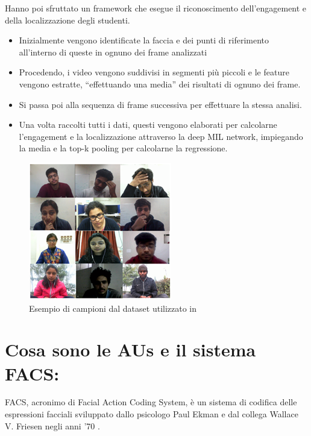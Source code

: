 Hanno poi sfruttato un framework che esegue il riconoscimento dell’engagement e della localizzazione degli studenti.
\begin{itemize}
    \item Inizialmente vengono identificate la faccia e dei punti di riferimento all’interno di queste in ognuno dei frame analizzati 
    \item Procedendo, i video vengono suddivisi in segmenti più piccoli e le feature vengono estratte, “effettuando una media” dei risultati di ognuno dei frame.
    \item Si passa poi alla sequenza di frame successiva per effettuare la stessa analisi.
    \item Una volta raccolti tutti i dati, questi vengono elaborati per calcolarne l’engagement e la localizzazione attraverso la deep MIL network, impiegando la media e la top-k pooling per calcolarne la regressione.
\end{itemize}


\begin{figure}
    \begin{center}    
        \includegraphics[width=0.8\linewidth]{images/4.png}
        \caption{Esempio di campioni dal dataset utilizzato in \cite{PredLocStudEngagInTheWild}}
    \end{center}
\end{figure}

\section{Cosa sono le AUs e il sistema FACS:}
FACS, acronimo di Facial Action Coding System, è un sistema di codifica delle espressioni facciali sviluppato dallo psicologo Paul Ekman e dal collega Wallace V. Friesen negli anni '70 \cite{PyFeat}.

